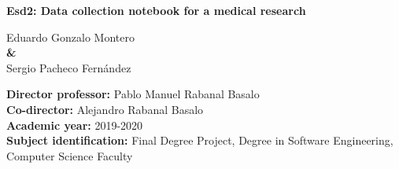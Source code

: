 \documentclass{report}
\begin{document}
\begin{titlepage}
        {\huge\textbf{Esd2: Data collection notebook for a medical research}}
        
        \vspace{1.4cm}
    
        {\Large Eduardo Gonzalo Montero \\}
        \vspace{0.5cm}
        {\textbf \&\\}
        \vspace{0.5cm}
        {\Large Sergio Pacheco Fernández \\}
        
        \vspace{1.4cm}
        
        \raggedright
        {\Large \textbf{Director professor:} Pablo Manuel Rabanal Basalo \\}
        \vspace{0.1cm}
         {\Large \textbf{Co-director:} Alejandro Rabanal Basalo \\}
        \vspace{0.1cm}
        {\Large\textbf {Academic year:} 2019-2020 \\}
        \vspace{0.1cm}
        {\Large\textbf {Subject identification: }Final Degree Project, Degree in Software Engineering, Computer Science Faculty\\}
    
        \clearpage
     \end{titlepage}

    \renewcommand{\contentsname}{Índice}
    \tableofcontents
    
    
    
    
    
     
    
    
    
    
    
    
    
    

    
    
    
\end{document}
